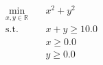 \begin{align}
  \min_{x, y \in \mathbb{R}} \quad & x^2 + y^2 \\
  \text{s.t.} \quad & x + y \ge 10.0 \\
                     & x \ge 0.0 \\
                     & y \ge 0.0
\end{align}

